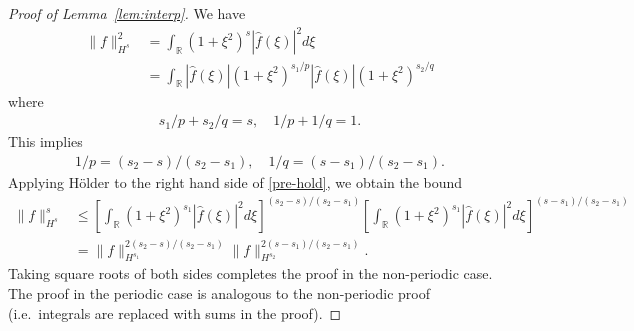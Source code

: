 \documentclass[12pt,reqno]{amsart}
\numberwithin{equation}{section}  %
\numberwithin{figure}{section}
\newcommand{\rr}{\mathbb{R}}
\newcommand{\wh}{\widehat}
\begin{document}
\begin{proof}[Proof of Lemma~\ref{lem:interp}]
 We have
 \begin{equation}
   \label{pre-hold}
 \begin{split}
   \| f \|_{H^{s}}^{2}
   & = \int_{\rr} (1 + \xi^{2})^{s} | \wh{f}(\xi) |^{2} d \xi
   \\
   & = \int_{\rr} | \wh{f}(\xi) | (1 + \xi^{2})^{s_{1}/p} | \wh{f}(\xi) |
   (1 + \xi^{2})^{s_{2}/q} 
 \end{split}
 \end{equation}
 where
 \begin{equation*}
 \begin{split}
   s_{1}/p + s_{2}/q =s, \quad 1/p + 1/q =1.
 \end{split}
 \end{equation*}
This implies 
 \begin{equation*}
 \begin{split}
   1/p = (s_{2} -s)/(s_{2} -s_{1}), \quad 1/q = (s -s_{1})/(s_{2} -s_{1}). 
 \end{split}
 \end{equation*}
 Applying H\"older to the right hand side of \eqref{pre-hold}, we obtain the
 bound
 \begin{equation*}
 \begin{split}
   \| f \|_{H^{s}}^{s}
   & \le  \left[ \int_{\rr} (1 + \xi^{2})^{s_{1}} | \wh{f}(\xi) |^{2} d \xi
   \right]^{(s_{2} - s)/(s_{2} -s_{1})} \left[ \int_{\rr} (1 + \xi^{2})^{s_{1}}
   | \wh{f}(\xi) |^{2} d \xi \right]^{(s - s_{1})/(s_{2} -s_{1})}
   \\
   & = \| f \|_{H^{s_{1}}}^{2 (s_{2} - s)/(s_{2} -s_{1})}
   \| f \|_{H^{s_{2}}}^{2 (s - s_{1})/(s_{2} -s_{1})}.
 \end{split}
 \end{equation*}
 Taking square roots of both sides completes the proof in the non-periodic case.
 The proof in the periodic case is analogous to the non-periodic proof (i.e.\
 integrals are replaced with sums in the proof).
  \end{proof}
\end{document}
